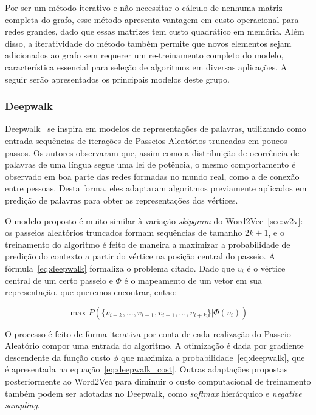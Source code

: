 Por ser um método iterativo e não necessitar o cálculo de nenhuma matriz completa
do grafo, esse método apresenta vantagem em custo operacional para redes
grandes, dado que essas matrizes tem custo quadrático em memória.
Além disso, a iteratividade do método também permite que novos elementos sejam
adicionados ao grafo sem requerer um re-treinamento completo do modelo,
característica essencial para seleção de algoritmos em diversas aplicações.
A seguir serão apresentados os principais modelos deste grupo.

\subsubsection{Deepwalk}

Deepwalk~\cite{perozzi14} se inspira em modelos de representações de palavras,
utilizando como entrada sequências de iterações de Passeios Aleatórios truncadas
em poucos passos.
Os autores observaram que, assim como a distribuição de ocorrência de palavras de
uma língua segue uma lei de potência, o mesmo comportamento é observado em boa
parte das redes formadas no mundo real, como a de conexão entre pessoas.
Desta forma, eles adaptaram algoritmos previamente aplicados em predição de
palavras para obter as representações dos vértices.

O modelo proposto é muito similar à variação \textit{skipgram} do
Word2Vec~\ref{sec:w2v}: os passeios aleatórios truncados formam sequências de
tamanho $2k + 1$, e o treinamento do algoritmo é feito de maneira a maximizar a
probabilidade de predição do contexto a partir do vértice na posição central do
passeio.
A fórmula~\ref{eq:deepwalk} formaliza o problema citado.
Dado que $v_i$ é o vértice central de um certo passeio e $\Phi$ é o mapeamento
de um vetor em sua representação, que queremos encontrar, entao:

\begin{equation} \label{eq:deepwalk}
    \operatorname{max} P(\{v_{i-k},...,v_{i-1},v_{i+1},...,v_{i+k}\}|\Phi(v_i))
\end{equation}

O processo é feito de forma iterativa por conta de cada realização do Passeio
Aleatório compor uma entrada do algoritmo.
A otimização é dada por gradiente descendente da função custo $\phi$ que maximiza
a probabilidade~\ref{eq:deepwalk}, que é apresentada na
equação~\ref{eq:deepwalk_cost}.
Outras adaptações propostas posteriormente ao Word2Vec para diminuir o custo
computacional de treinamento também podem ser adotadas no Deepwalk, como
\textit{softmax} hierárquico e \textit{negative sampling}.

